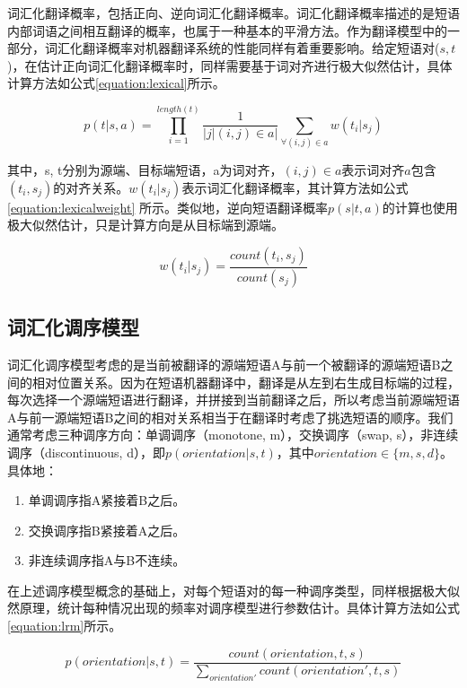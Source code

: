 \documentclass[master, winfont]{njuthesis}
\begin{document}
词汇化翻译概率，包括正向、逆向词汇化翻译概率。词汇化翻译概率描述的是短语内部词语之间相互翻译的概率，也属于一种基本的平滑方法。作为翻译模型中的一部分，词汇化翻译概率对机器翻译系统的性能同样有着重要影响。给定短语对($s,t$)，在估计正向词汇化翻译概率时，同样需要基于词对齐进行极大似然估计，具体计算方法如公式\ref{equation:lexical}所示。

\begin{equation}
  \label{equation:lexical}
  p(t|s,a)=\prod_{i=1}^{length(t)} \frac{1}{|{j|(i,j) \in a}|} \sum_{\forall (i,j) \in a} w(t_i|s_j)
\end{equation}

其中，s, t分别为源端、目标端短语，a为词对齐，$(i,j) \in a$表示词对齐$a$包含$(t_i, s_j)$的对齐关系。$w(t_i|s_j)$表示词汇化翻译概率，其计算方法如公式\ref{equation:lexicalweight} 所示。类似地，逆向短语翻译概率$p(s|t,a)$的计算也使用极大似然估计，只是计算方向是从目标端到源端。

\begin{equation}
  \label{equation:lexicalweight}
  w(t_i|s_j)=\frac{count(t_i,s_j)}{count(s_j)}
\end{equation}
\subsection{词汇化调序模型}
词汇化调序模型\cite{tillmann2004unigram}考虑的是当前被翻译的源端短语A与前一个被翻译的源端短语B之间的相对位置关系。因为在短语机器翻译中，翻译是从左到右生成目标端的过程，每次选择一个源端短语进行翻译，并拼接到当前翻译之后，所以考虑当前源端短语A与前一源端短语B之间的相对关系相当于在翻译时考虑了挑选短语的顺序。我们通常考虑三种调序方向：单调调序（monotone, m），交换调序（swap, s），非连续调序（discontinuous, d），即$ p(orientation|s, t)$，其中$orientation \in \{m, s, d\}$。 具体地：
\begin{enumerate}
  \item 单调调序指A紧接着B之后。
  \item 交换调序指B紧接着A之后。
  \item 非连续调序指A与B不连续。
\end{enumerate}

在上述调序模型概念的基础上，对每个短语对的每一种调序类型，同样根据极大似然原理，统计每种情况出现的频率对调序模型进行参数估计。具体计算方法如公式\ref{equation:lrm}所示。

\begin{equation}
  \label{equation:lrm}
    p(orientation|s,t)=\frac{count(orientation,t,s)}{\sum_{orientation'} count(orientation',t,s)}
\end{equation}
\end{document}
